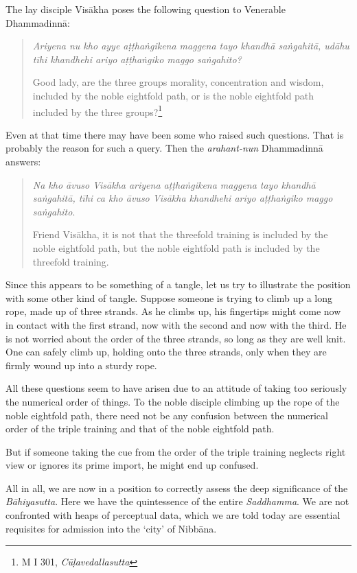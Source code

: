The lay disciple Visākha poses the following question to Venerable Dhammadinnā:

\begin{quote}
\emph{Ariyena nu kho ayye aṭṭhaṅgikena maggena tayo khandhā saṅgahitā, udāhu tīhi khandhehi ariyo aṭṭhaṅgiko maggo saṅgahito?}

Good lady, are the three groups morality, concentration and wisdom, included by the noble eightfold path, or is the noble eightfold path included by the three groups?\footnote{M I 301, \emph{Cūḷavedallasutta}}
\end{quote}

Even at that time there may have been some who raised such questions. That is probably the reason for such a query. Then the \emph{arahant-nun} Dhammadinnā answers:

\begin{quote}
\emph{Na kho āvuso Visākha ariyena aṭṭhaṅgikena maggena tayo khandhā saṅgahitā, tīhi ca kho āvuso Visākha khandhehi ariyo aṭṭhaṅgiko maggo saṅgahito}.

Friend Visākha, it is not that the threefold training is included by the noble eightfold path, but the noble eightfold path is included by the threefold training.
\end{quote}

Since this appears to be something of a tangle, let us try to illustrate the position with some other kind of tangle. Suppose someone is trying to climb up a long rope, made up of three strands. As he climbs up, his fingertips might come now in contact with the first strand, now with the second and now with the third. He is not worried about the order of the three strands, so long as they are well knit. One can safely climb up, holding onto the three strands, only when they are firmly wound up into a sturdy rope.

All these questions seem to have arisen due to an attitude of taking too seriously the numerical order of things. To the noble disciple climbing up the rope of the noble eightfold path, there need not be any confusion between the numerical order of the triple training and that of the noble eightfold path.

But if someone taking the cue from the order of the triple training neglects right view or ignores its prime import, he might end up confused.

All in all, we are now in a position to correctly assess the deep significance of the \emph{Bāhiyasutta}. Here we have the quintessence of the entire \emph{Saddhamma}. We are not confronted with heaps of perceptual data, which we are told today are essential requisites for admission into the `city' of Nibbāna.


